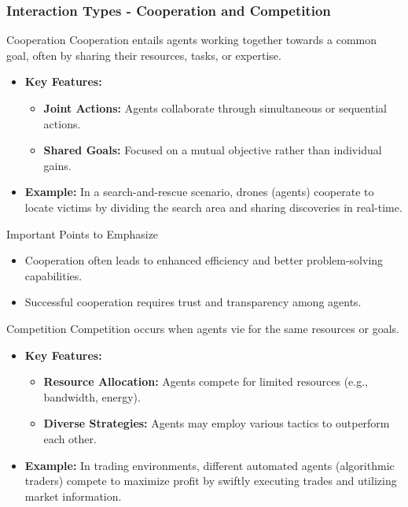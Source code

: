 \documentclass[aspectratio=169]{beamer}
\begin{document}
\begin{frame}[fragile]
    \frametitle{Interaction Types - Cooperation and Competition}
    \begin{block}{Cooperation}
        Cooperation entails agents working together towards a common goal, often by sharing their resources, tasks, or expertise.
    \end{block}
    
    \begin{itemize}
        \item \textbf{Key Features:}
        \begin{itemize}
            \item \textbf{Joint Actions:} Agents collaborate through simultaneous or sequential actions.
            \item \textbf{Shared Goals:} Focused on a mutual objective rather than individual gains.
        \end{itemize}
        \item \textbf{Example:} In a search-and-rescue scenario, drones (agents) cooperate to locate victims by dividing the search area and sharing discoveries in real-time.
    \end{itemize}

    \begin{block}{Important Points to Emphasize}
        \begin{itemize}
            \item Cooperation often leads to enhanced efficiency and better problem-solving capabilities.
            \item Successful cooperation requires trust and transparency among agents.
        \end{itemize}
    \end{block}

    \begin{block}{Competition}
        Competition occurs when agents vie for the same resources or goals.
    \end{block}
    
    \begin{itemize}
        \item \textbf{Key Features:}
        \begin{itemize}
            \item \textbf{Resource Allocation:} Agents compete for limited resources (e.g., bandwidth, energy).
            \item \textbf{Diverse Strategies:} Agents may employ various tactics to outperform each other.
        \end{itemize}
        \item \textbf{Example:} In trading environments, different automated agents (algorithmic traders) compete to maximize profit by swiftly executing trades and utilizing market information.
    \end{itemize}


\end{frame}
\end{document}
